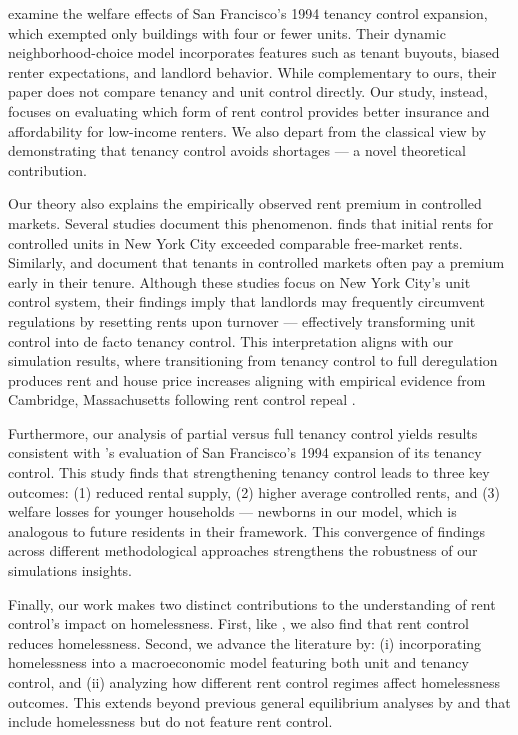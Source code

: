 \documentclass[parskip=full]{article}
\begin{document}
\citet{diamond-2019} examine the welfare effects of San Francisco's 1994 tenancy control expansion, which exempted only buildings with four or fewer units. Their dynamic neighborhood-choice model incorporates features such as tenant buyouts, biased renter expectations, and landlord behavior. While complementary to ours, their paper does not compare tenancy and unit control directly. Our study, instead, focuses on evaluating which form of rent control provides better insurance and affordability for low-income renters. We also depart from the classical view by demonstrating that tenancy control avoids shortages — a novel theoretical contribution.

Our theory also explains the empirically observed rent premium in controlled markets. Several studies document this phenomenon. \citet{nagy-1997} finds that initial rents for controlled units in New York City exceeded comparable free-market rents. Similarly, \citet{early-2000} and \citet{cjq-2023} document that tenants in controlled markets often pay a premium early in their tenure. Although these studies focus on New York City’s unit control system, their findings imply that landlords may frequently circumvent regulations by resetting rents upon turnover — effectively transforming unit control into de facto tenancy control. This interpretation aligns with our simulation results, where transitioning from tenancy control to full deregulation produces rent and house price increases aligning with empirical evidence from Cambridge, Massachusetts following rent control repeal \citep{sims-2007, app-2014}.

Furthermore, our analysis of partial versus full tenancy control yields results consistent with \citet{dmq-2019}'s evaluation of San Francisco's 1994 expansion of its tenancy control. This study finds that strengthening tenancy control leads to three key outcomes: (1) reduced rental supply, (2) higher average controlled rents, and (3) welfare losses for younger households — newborns in our model, which is analogous to future residents in their framework. This convergence of findings across different methodological approaches strengthens the robustness of our simulations insights.

Finally, our work makes two distinct contributions to the understanding of rent control's impact on homelessness. First, like \citet{eo-1998}, we also find that rent control reduces homelessness. Second, we advance the literature by: (i) incorporating homelessness into a macroeconomic model featuring both unit and tenancy control, and (ii) analyzing how different rent control regimes affect homelessness outcomes. This extends beyond previous general equilibrium analyses by \citet{az-2024} and \citet{abramson-2024} that include homelessness but do not feature rent control.
\end{document}
